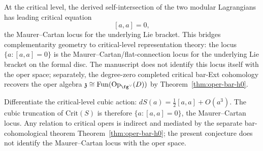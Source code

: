 \begin{conjecture}\label{conj:affine-critical-mc}
At the critical level, the derived self-intersection of the two
modular Lagrangians has leading critical equation
\[
[a,a] = 0,
\]
the Maurer--Cartan locus for the underlying Lie bracket.
This bridges complementarity geometry to critical-level
representation theory: the locus $\{a : [a,a] = 0\}$ is the
Maurer--Cartan/flat-connection locus for the underlying Lie
bracket on the formal disc. The manuscript does not identify this
locus itself with the oper space; separately, the degree-zero
completed critical bar-Ext cohomology recovers the oper algebra
$\mathfrak{z} \cong \mathrm{Fun}(\mathrm{Op}_{\fg^\vee}(D))$
by Theorem~\ref{thm:oper-bar-h0}.
\end{conjecture}

\begin{remark}
Differentiate the critical-level cubic action:
$dS(a) = \tfrac{1}{2}[a,a] + O(a^3)$. The cubic truncation of
$\mathrm{Crit}(S)$ is therefore $\{a : [a,a] = 0\}$, the
Maurer--Cartan locus. Any relation to critical opers is indirect
and mediated by the separate bar-cohomological theorem
Theorem~\ref{thm:oper-bar-h0}; the present conjecture does not
identify the Maurer--Cartan locus with the oper space.
\end{remark}

